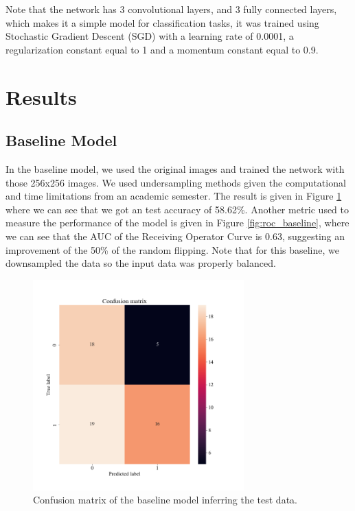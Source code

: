 \documentclass[conference]{IEEEtran}
\begin{document}
Note that the network has 3 convolutional layers, and 3 fully connected layers, which makes it a simple model for classification tasks, it was trained using Stochastic Gradient Descent (SGD) with a learning rate of 0.0001, a regularization constant equal to 1 and a momentum constant equal to 0.9. 
\section{Results}

\subsection{Baseline Model}

In the baseline model, we used the original images and trained the network with those 256x256 images. We used undersampling methods given the computational and time limitations from an academic semester. The result is given in Figure \ref{fig:confusion_baseline} where we can see that we got an test accuracy of 58.62\%. Another metric used to measure the performance of the model is given in Figure \ref{fig:roc_baseline}, where we can see that the AUC of the Receiving Operator Curve is 0.63, suggesting an improvement of the 50\% of the random flipping. Note that for this baseline, we downsampled the data so the input data was properly balanced. 

\begin{figure}
\centering
\includegraphics[width=3.2in]{confusion_baseline}
\caption{Confusion matrix of the baseline model inferring the test data.}
\label{fig:confusion_baseline}
\end{figure}
\end{document}
